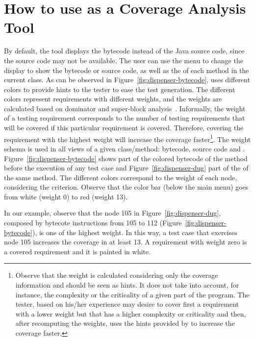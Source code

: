 \section{How to use \toolname as a Coverage Analysis
Tool}\label{sec:coverage}

By default, the tool displays the bytecode instead of the Java
source code, since the source code may not be available. The user
can use the  menu to change the display to show
the bytecode or source code, as well as the \DUG of each method in
the current class.  As can be observed in
Figure~\ref{fig:dispenser-bytecode}, \toolname uses different
colors to provide hints to the tester to ease the test generation.
The different colors represent requirements with different
weights, and the weights are calculated based on dominator and
super-block analysis~\cite{Agrawal94DSBP}. Informally, the weight
of a testing requirement corresponds to the number of testing
requirements that will be covered if this particular requirement
is covered. Therefore, covering the requirement with the highest
weight will increase the coverage faster\footnote{Observe that the
weight is calculated
        considering only the coverage information
        and should be seen as hints. It does not
        take into account, for instance, the complexity or
        the criticality of a given part of the program. The tester, based on
        his/her experience may desire to cover first a requirement with a
        lower weight but that has a higher complexity or criticality and then,
        after recomputing the weights, uses the hints provided by \toolname to
        increase the coverage faster.}.
The weight schema is used in all views of a given class/method:
bytecode, source code and \DUG.
Figure~\ref{fig:dispenser-bytecode} shows part of the colored
bytecode of the  method before the
execution of any test case and Figure~\ref{fig:dispenser-dug} part
of the \DUG of the same method. The different colors correspond to
the weight of each node, considering the 
criterion. Observe that the color bar (below the main menu) goes
from white (weight 0) to red (weight 13).

In our example, observe that the node 105 in
Figure~\ref{fig:dispenser-dug}, composed by bytecote instructions
from 105 to 112 (Figure~\ref{fig:dispenser-bytecode}), is one of
the highest weight. In this way, a test case that exercises node
105 increases the coverage in at least 13. A requirement with
weight zero is a covered requirement and it is painted in white.

